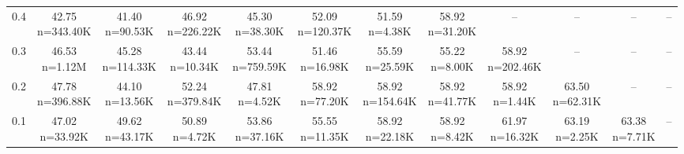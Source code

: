 \begin{table}
\begin{tabular}{lccccccccccc}
0.4 & \makecell{42.75 \\ \scriptsize n=343.40K} & \makecell{41.40 \\ \scriptsize n=90.53K} & \makecell{46.92 \\ \scriptsize n=226.22K} & \makecell{45.30 \\ \scriptsize n=38.30K} & \makecell{52.09 \\ \scriptsize n=120.37K} & \makecell{51.59 \\ \scriptsize n=4.38K} & \makecell{58.92 \\ \scriptsize n=31.20K} & -- & -- & -- & -- \\
0.3 & \makecell{46.53 \\ \scriptsize n=1.12M} & \makecell{45.28 \\ \scriptsize n=114.33K} & \makecell{43.44 \\ \scriptsize n=10.34K} & \makecell{53.44 \\ \scriptsize n=759.59K} & \makecell{51.46 \\ \scriptsize n=16.98K} & \makecell{55.59 \\ \scriptsize n=25.59K} & \makecell{55.22 \\ \scriptsize n=8.00K} & \makecell{58.92 \\ \scriptsize n=202.46K} & -- & -- & -- \\
0.2 & \makecell{47.78 \\ \scriptsize n=396.88K} & \makecell{44.10 \\ \scriptsize n=13.56K} & \makecell{52.24 \\ \scriptsize n=379.84K} & \makecell{47.81 \\ \scriptsize n=4.52K} & \makecell{58.92 \\ \scriptsize n=77.20K} & \makecell{58.92 \\ \scriptsize n=154.64K} & \makecell{58.92 \\ \scriptsize n=41.77K} & \makecell{58.92 \\ \scriptsize n=1.44K} & \makecell{63.50 \\ \scriptsize n=62.31K} & -- & -- \\
0.1 & \makecell{47.02 \\ \scriptsize n=33.92K} & \makecell{49.62 \\ \scriptsize n=43.17K} & \makecell{50.89 \\ \scriptsize n=4.72K} & \makecell{53.86 \\ \scriptsize n=37.16K} & \makecell{55.55 \\ \scriptsize n=11.35K} & \makecell{58.92 \\ \scriptsize n=22.18K} & \makecell{58.92 \\ \scriptsize n=8.42K} & \makecell{61.97 \\ \scriptsize n=16.32K} & \makecell{63.19 \\ \scriptsize n=2.25K} & \makecell{63.38 \\ \scriptsize n=7.71K} & -- \\

\end{tabular}
\end{table}

